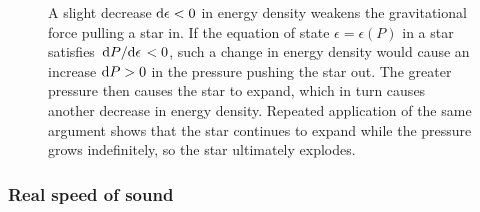 \begin{figure}
\caption{\label{fig:nstars:star_explosion}%
A slight decrease $\mathop{}\!\mathrm{d} \epsilon < 0$ in energy density weakens the gravitational force pulling a star in.
If the equation of state $\epsilon = \epsilon(P)$ in a star satisfies $\odv{P}/{\epsilon} < 0$, such a change in energy density would cause an increase $\mathop{}\!\mathrm{d} P > 0$ in the pressure pushing the star out.
The greater pressure then causes the star to expand, which in turn causes another decrease in energy density.
Repeated application of the same argument shows that the star continues to expand while the pressure grows indefinitely, so the star ultimately explodes.
}
\end{figure}

\subsubsection{Real speed of sound}

